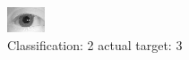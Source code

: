 \begin{figure}[h!]
\begin{center}
\includegraphics[width=0.60\columnwidth]{figures/ID1128_class_2_target_3.png}
\end{center}
\caption{ Classification: 2 actual target: 3}
\label{fig:ID1128_class_2_target_3}
\end{figure}
